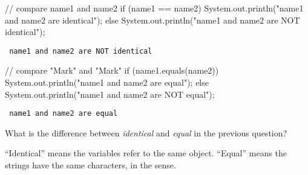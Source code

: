 \begin{javalst}
// compare name1 and name2
if (name1 == name2) {
    System.out.println("name1 and name2 are identical");
} else {
    System.out.println("name1 and name2 are NOT identical");
}
\end{javalst}

\vspace{-2ex}
\begin{answer}[1em]
\tt \hspace{1em} name1 and name2 are NOT identical
\end{answer}

\begin{javalst}
// compare "Mark" and "Mark"
if (name1.equals(name2)) {
    System.out.println("name1 and name2 are equal");
} else {
    System.out.println("name1 and name2 are NOT equal");
}
\end{javalst}

\vspace{-2ex}
\begin{answer}[1em]
\tt \hspace{1em} name1 and name2 are equal
\end{answer}


\Q What is the difference between \emph{identical} and \emph{equal} in the previous question?

\begin{answer}[4em]
``Identical'' means the variables refer to the same  object.
``Equal'' means the strings have the same characters, in the  sense.
\end{answer}
